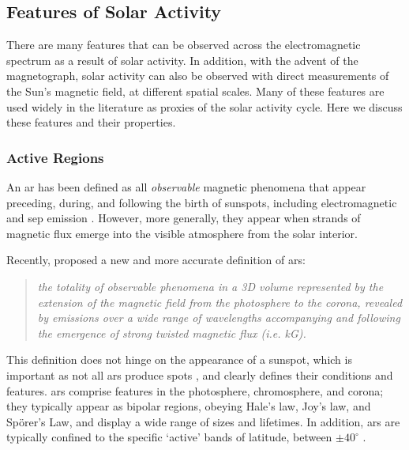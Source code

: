 \subsection{Features of Solar Activity}

There are many features that can be observed across the electromagnetic spectrum as a result of solar activity. In addition, with the advent of the magnetograph, solar activity can also be observed with direct measurements of the Sun's magnetic field, at different spatial scales. Many of these features are used widely in the literature as proxies of the solar activity cycle. Here we discuss these features and their properties.

\glsresetall 
{}
\subsubsection*{Active Regions}

An \gls{ar} has been defined as all \textit{observable} magnetic phenomena that appear preceding, during, and following the birth of sunspots, including electromagnetic and \gls{sep} emission \citep{kiepenheuer_structure_1968}. However, more generally, they appear when strands of magnetic flux emerge into the visible atmosphere from the solar interior.%

Recently, \citet{van_driel-gesztelyi_evolution_2015} proposed a new and more accurate definition of \glspl{ar}:

\begin{quote}
	\textit{the totality of observable phenomena in a 3D volume represented by the extension of the magnetic field from the photosphere to the corona, revealed by emissions over a wide range of wavelengths accompanying and following the emergence of strong twisted magnetic flux (i.e. kG).}%
\end{quote}

This definition does not hinge on the appearance of a sunspot, which is important as not all \glspl{ar} produce spots \citep{van_driel-gesztelyi_evolution_2015}, and clearly defines their conditions and features. \glspl{ar} comprise features in the photosphere, chromosphere, and corona; they typically appear as bipolar regions, obeying Hale's law, Joy's law, and Sp\"{o}rer's Law, and display a wide range of sizes and lifetimes. In addition, \glspl{ar} are typically confined to the specific `active' bands of latitude, between $\pm40^{\circ}$ \citep{harvey_solar_2001}.

